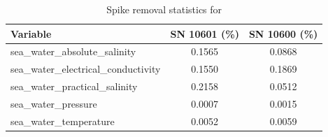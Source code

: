 \begin{table}[h]
\centering
\caption{Spike removal statistics for \projectname{} \casenumber{}}
\label{tab:spike_stats}
\begin{tabular}{|l|c|c|}
\hline
Variable & SN 10601 (\%) & SN 10600 (\%) \\
\hline
sea\_water\_absolute\_salinity & 0.1565 & 0.0868 \\
sea\_water\_electrical\_conductivity & 0.1550 & 0.1869 \\
sea\_water\_practical\_salinity & 0.2158 & 0.0512 \\
sea\_water\_pressure & 0.0007 & 0.0015 \\
sea\_water\_temperature & 0.0052 & 0.0059 \\
\hline
\end{tabular}
\end{table}
